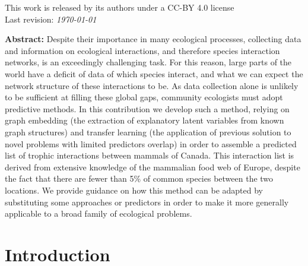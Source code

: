 \documentclass[11pt]{article}
\begin{document}
\vfill
This work is released by its authors under a CC-BY 4.0 license\hfill\ccby\\
Last revision: \emph{\today}

\clearpage
\thispagestyle{empty}

\vfill
\textbf{\sffamily Abstract: }Despite their importance in many ecological
processes, collecting data and information on ecological interactions,
and therefore species interaction networks, is an exceedingly
challenging task. For this reason, large parts of the world have a
deficit of data of which species interact, and what we can expect the
network structure of these interactions to be. As data collection alone
is unlikely to be sufficient at filling these global gaps, community
ecologists must adopt predictive methods. In this contribution we
develop such a method, relying on graph embedding (the extraction of
explanatory latent variables from known graph structures) and transfer
learning (the application of previous solution to novel problems with
limited predictors overlap) in order to assemble a predicted list of
trophic interactions between mammals of Canada. This interaction list is
derived from extensive knowledge of the mammalian food web of Europe,
despite the fact that there are fewer than 5\% of common species between
the two locations. We provide guidance on how this method can be adapted
by substituting some approaches or predictors in order to make it more
generally applicable to a broad family of ecological problems.
\vfill

\clearpage
\linenumbers
\pagestyle{normal}

\hypertarget{introduction}{%
\section{Introduction}\label{introduction}}
\end{document}
